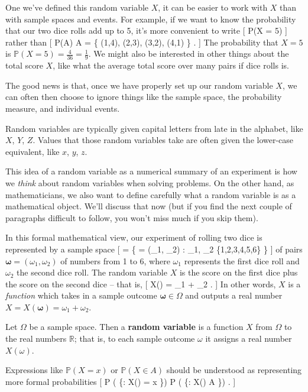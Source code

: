 \documentclass[
  letterpaper,
  DIV=11,
  numbers=noendperiod]{scrreprt}
\theoremstyle{remark}
\begin{document}
One we've defined this random variable \(X\), it can be easier to work
with \(X\) than with sample spaces and events. For example, if we want
to know the probability that our two dice rolls add up to 5, it's more
convenient to write {[} \mathbb P(X = 5) {]} rather than {[}
\mathbb P(A) \quad {} \quad A = \big\{ (1,4), (2,3), (3,2),
(4,1) \big\} . {]} The probability that \(X = 5\) is
\(\mathbb P(X = 5) = \frac{4}{36} = \frac{1}{9}\). We might also be
interested in other things about the total score \(X\), like what the
average total score over many pairs if dice rolls is.

The good news is that, once we have properly set up our random variable
\(X\), we can often then choose to ignore things like the sample space,
the probability measure, and individual events.

Random variables are typically given capital letters from late in the
alphabet, like \(X\), \(Y\), \(Z\). Values that those random variables
take are often given the lower-case equivalent, like \(x\), \(y\),
\(z\).

This idea of a random variable as a numerical summary of an experiment
is how we \emph{think} about random variables when solving problems. On
the other hand, as mathematicians, we also want to define carefully what
a random variable is as a mathematical object. We'll discuss that now
(but if you find the next couple of paragraphs difficult to follow, you
won't miss much if you skip them).

In this formal mathematical view, our experiment of rolling two dice is
represented by a sample space {[} \Omega = \big\{ \boldsymbol\omega =
(\omega\_1, \omega\_2) : \omega\_1, \omega\_2 \in \{1,2,3,4,5,6\} \big\}
{]} of pairs \(\boldsymbol\omega = (\omega_1, \omega_2)\) of numbers
from 1 to 6, where \(\omega_1\) represents the first dice roll and
\(\omega_2\) the second dice roll. The random variable \(X\) is the
score on the first dice plus the score on the second dice -- that is,
{[} X(\boldsymbol\omega) = \omega\_1 + \omega\_2 . {]} In other words,
\(X\) is a \emph{function} which takes in a sample outcome
\(\boldsymbol\omega \in \Omega\) and outputs a real number
\(X = X(\boldsymbol\omega) = \omega_1 + \omega_2\).

Let \(\Omega\) be a sample space. Then a \textbf{random variable} is a
function \(X\) from \(\Omega\) to the real numbers \(\mathbb R\); that
is, to each sample outcome \(\omega\) it assigns a real number
\(X(\omega)\).

Expressions like \(\mathbb P(X = x)\) or \(\mathbb P(X \in A)\) should
be understood as representing more formal probabilities {[} \mathbb P
\big( \{\omega : X(\omega) = x \}\big) \quad {} \quad \mathbb P
\big( \{\omega : X(\omega) \in A \}\big) . {]}
\end{document}
